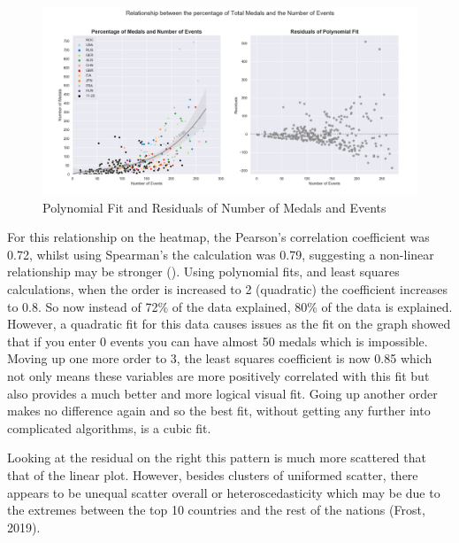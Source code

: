 \documentclass[a4 paper, 12pt]{article}
\begin{document}
        \begin{figure} [H]
            \centering
            \includegraphics[width=\textwidth, frame]
                {./images/graph/countries_medals_resid.png}      
                \caption{Polynomial Fit and Residuals of Number of Medals and Events} 
        \end{figure}
        For this relationship on the heatmap, the Pearson's correlation coefficient was 0.72, whilst using Spearman's the calculation was 0.79, suggesting a non-linear relationship may be stronger (). Using polynomial fits, and least squares calculations, when the order is increased to 2 (quadratic) the coefficient increases to 0.8. So now instead of 72\% of the data explained, 80\% of the data is explained. However, a quadratic fit for this data causes issues as the fit on the graph showed that if you enter 0 events you can have almost 50 medals which is impossible. Moving up one more order to 3, the least squares coefficient is now 0.85 which not only means these variables are more positively correlated with this fit but also provides a much better and more logical visual fit. Going up another order makes no difference again and so the best fit, without getting any further into complicated algorithms, is a cubic fit. 

        Looking at the residual on the right this pattern is much more scattered that that of the linear plot. However, besides clusters of uniformed scatter, there appears to be unequal scatter overall or heteroscedasticity which may be due to the extremes between the top 10 countries and the rest of the nations (Frost, 2019). 
        
\end{document}
